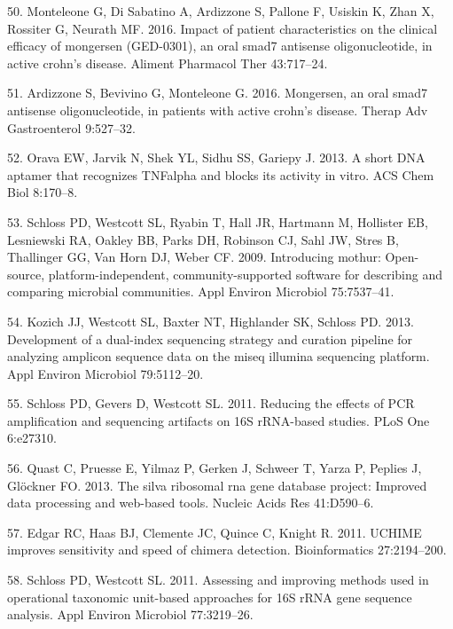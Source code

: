 \documentclass[12pt,]{article}
\begin{document}
\hypertarget{ref-monteleone_mongersen_2016}{}
50. Monteleone G, Di Sabatino A, Ardizzone S, Pallone F, Usiskin K, Zhan
X, Rossiter G, Neurath MF. 2016. Impact of patient characteristics on
the clinical efficacy of mongersen (GED-0301), an oral smad7 antisense
oligonucleotide, in active crohn's disease. Aliment Pharmacol Ther
43:717--24.

\hypertarget{ref-ardizzone_mongersen_2016}{}
51. Ardizzone S, Bevivino G, Monteleone G. 2016. Mongersen, an oral
smad7 antisense oligonucleotide, in patients with active crohn's
disease. Therap Adv Gastroenterol 9:527--32.

\hypertarget{ref-orava_short_2013}{}
52. Orava EW, Jarvik N, Shek YL, Sidhu SS, Gariepy J. 2013. A short DNA
aptamer that recognizes TNFalpha and blocks its activity in vitro. ACS
Chem Biol 8:170--8.

\hypertarget{ref-schloss_mothur_2009}{}
53. Schloss PD, Westcott SL, Ryabin T, Hall JR, Hartmann M, Hollister
EB, Lesniewski RA, Oakley BB, Parks DH, Robinson CJ, Sahl JW, Stres B,
Thallinger GG, Van Horn DJ, Weber CF. 2009. Introducing mothur:
Open-source, platform-independent, community-supported software for
describing and comparing microbial communities. Appl Environ Microbiol
75:7537--41.

\hypertarget{ref-Kozich_MiSeqSOP_2013}{}
54. Kozich JJ, Westcott SL, Baxter NT, Highlander SK, Schloss PD. 2013.
Development of a dual-index sequencing strategy and curation pipeline
for analyzing amplicon sequence data on the miseq illumina sequencing
platform. Appl Environ Microbiol 79:5112--20.

\hypertarget{ref-schloss_PCRartifacts_2011}{}
55. Schloss PD, Gevers D, Westcott SL. 2011. Reducing the effects of PCR
amplification and sequencing artifacts on 16S rRNA-based studies. PLoS
One 6:e27310.

\hypertarget{ref-Quast_silva_2013}{}
56. Quast C, Pruesse E, Yilmaz P, Gerken J, Schweer T, Yarza P, Peplies
J, Glöckner FO. 2013. The silva ribosomal rna gene database project:
Improved data processing and web-based tools. Nucleic Acids Res
41:D590--6.

\hypertarget{ref-edgar_uchime_2011}{}
57. Edgar RC, Haas BJ, Clemente JC, Quince C, Knight R. 2011. UCHIME
improves sensitivity and speed of chimera detection. Bioinformatics
27:2194--200.

\hypertarget{ref-schloss_OTUanalysis_2011}{}
58. Schloss PD, Westcott SL. 2011. Assessing and improving methods used
in operational taxonomic unit-based approaches for 16S rRNA gene
sequence analysis. Appl Environ Microbiol 77:3219--26.
\end{document}
